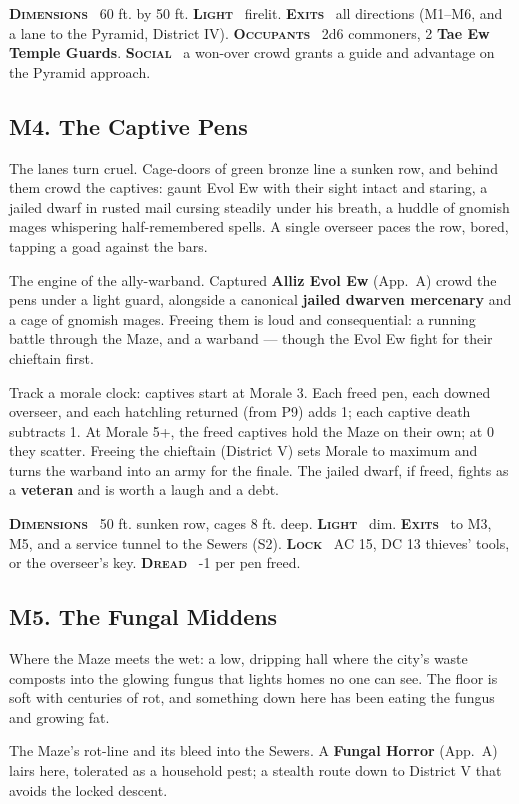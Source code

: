\documentclass[10pt,twoside]{article}
\newcommand{\tech}[1]{\textbf{\scshape\textcolor{stone}{#1}}\ }
\begin{document}
\begin{techbox}
\tech{Dimensions} 60 ft. by 50 ft. \tech{Light} firelit. \tech{Exits} all directions
(M1--M6, and a lane to the Pyramid, District IV). \tech{Occupants} 2d6 commoners,
2 \textbf{Tae Ew Temple Guards}. \tech{Social} a won-over crowd grants a guide and
advantage on the Pyramid approach.
\end{techbox}

\subsection{M4. The Captive Pens}
\begin{readaloud}
The lanes turn cruel. Cage-doors of green bronze line a sunken row, and behind them
crowd the captives: gaunt Evol Ew with their sight intact and staring, a jailed
dwarf in rusted mail cursing steadily under his breath, a huddle of gnomish mages
whispering half-remembered spells. A single overseer paces the row, bored, tapping a
goad against the bars.
\end{readaloud}
The engine of the ally-warband. Captured \textbf{Alliz Evol Ew} (App.\ A) crowd the
pens under a light guard, alongside a canonical \textbf{jailed dwarven mercenary} and
a cage of gnomish mages. Freeing them is loud and consequential: a running battle
through the Maze, and a warband --- though the Evol Ew fight for their chieftain first.

\begin{dmnote}
Track a morale clock: captives start at Morale 3. Each freed pen, each downed
overseer, and each hatchling returned (from P9) adds 1; each captive death subtracts 1.
At Morale 5+, the freed captives hold the Maze on their own; at 0 they scatter. Freeing
the chieftain (District V) sets Morale to maximum and turns the warband into an army
for the finale. The jailed dwarf, if freed, fights as a \textbf{veteran} and is worth a
laugh and a debt.
\end{dmnote}

\begin{techbox}
\tech{Dimensions} 50 ft. sunken row, cages 8 ft. deep. \tech{Light} dim.
\tech{Exits} to M3, M5, and a service tunnel to the Sewers (S2). \tech{Lock} AC 15,
DC 13 thieves' tools, or the overseer's key. \tech{Dread} -1 per pen freed.
\end{techbox}

\subsection{M5. The Fungal Middens}
\begin{readaloud}
Where the Maze meets the wet: a low, dripping hall where the city's waste composts
into the glowing fungus that lights homes no one can see. The floor is soft with
centuries of rot, and something down here has been eating the fungus and growing fat.
\end{readaloud}
The Maze's rot-line and its bleed into the Sewers. A \textbf{Fungal Horror}
(App.\ A) lairs here, tolerated as a household pest; a stealth route down to
District V that avoids the locked descent.
\end{document}
